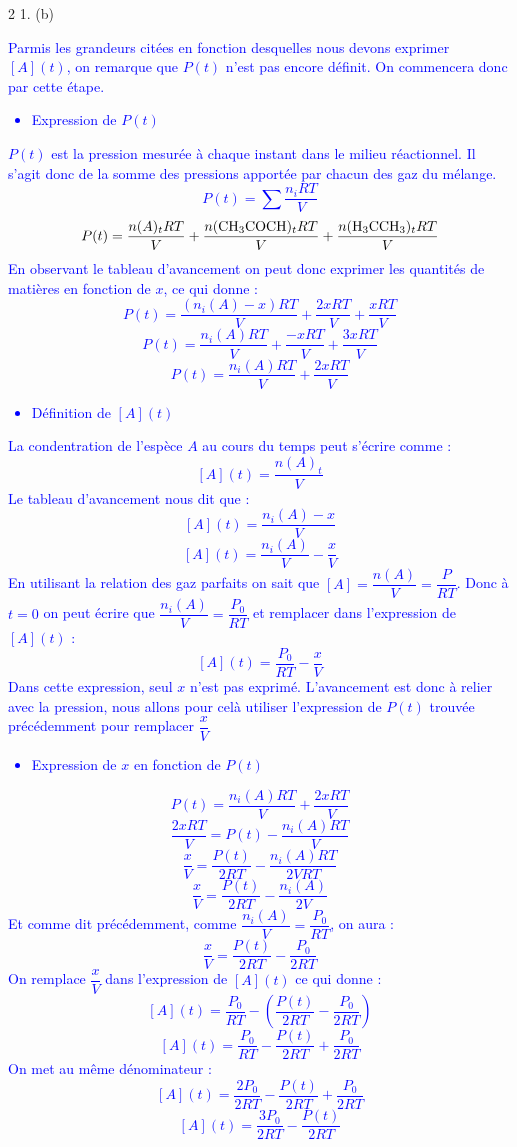 \documentclass[a4paper,11pt,fleqn]{article}%
\begin{document}
\begin{multicols}{2}
1. (b) \textcolor{blue}{Parmis les grandeurs citées en fonction desquelles nous devons exprimer $[A](t)$, on remarque que $P(t)$ n'est pas encore définit. On commencera donc par cette étape. \begin{itemize}
    \item Expression de $P(t)$
\end{itemize}
$P(t)$ est la pression mesurée à chaque instant dans le milieu réactionnel. Il s'agit donc de la somme des pressions apportée par chacun des gaz du mélange. $$P(t) = \sum{\dfrac{n_i R T}{V}}$$
$$P(t) = \dfrac{n(A)_t R T}{V} + \dfrac{n(\ce{CH3COCH})_t R T}{V} + \dfrac{n(\ce{H3CCH3})_t R T}{V}$$
En observant le tableau d'avancement on peut donc exprimer les quantités de matières en fonction de $x$, ce qui donne :
$$P(t) = \dfrac{(n_i(A)-x) R T}{V} + \dfrac{2x R T}{V} + \dfrac{x R T}{V}$$
$$P(t) = \dfrac{n_i(A) R T}{V} + \dfrac{-x R T}{V} + \dfrac{3x R T}{V}$$
$$P(t) = \dfrac{n_i(A) R T}{V}+ \dfrac{2x R T}{V}$$
\begin{itemize}
    \item Définition de $[A](t)$
\end{itemize}
La condentration de l'espèce $A$ au cours du temps peut s'écrire comme :
$$ [A](t) = \dfrac{n(A)_t}{V}$$
Le tableau d'avancement nous dit que :
$$ [A](t) = \dfrac{n_i(A)-x}{V}$$
$$ [A](t) = \dfrac{n_i(A)}{V} - \dfrac{x}{V}$$
En utilisant la relation des gaz parfaits on sait que $[A] = \dfrac{n(A)}{V} = \dfrac{P}{RT}$. Donc à $t=0$ on peut écrire que $\dfrac{n_i(A)}{V} = \dfrac{P_0}{RT}$ et remplacer dans l'expression de $ [A](t)$ :
$$ [A](t) = \dfrac{P_0}{RT} - \dfrac{x}{V}$$
Dans cette expression, seul $x$ n'est pas exprimé. L'avancement est donc à relier avec la pression, nous allons pour celà utiliser l'expression de $P(t)$ trouvée précédemment pour remplacer $\dfrac{x}{V}$
\begin{itemize}
    \item Expression de $x$ en fonction de $P(t)$
\end{itemize}
$$P(t) = \dfrac{n_i(A) R T}{V}+ \dfrac{2x R T}{V}$$
$$\dfrac{2x R T}{V} = P(t) - \dfrac{n_i(A) R T}{V}$$
$$\dfrac{x}{V} = \dfrac{P(t)}{2RT} - \dfrac{n_i(A) R T}{2VRT}$$
$$\dfrac{x}{V} =\dfrac{P(t)}{2RT} - \dfrac{n_i(A)}{2V}$$
Et comme dit précédemment, comme $\dfrac{n_i(A)}{V} = \dfrac{P_0}{RT}$, on aura :
$$\dfrac{x}{V} =\dfrac{P(t)}{2RT} - \dfrac{P_0}{2RT}$$
On remplace $\dfrac{x}{V}$ dans l'expression de $[A](t)$ ce qui donne :
$$ [A](t) = \dfrac{P_0}{RT} - \left(\dfrac{P(t)}{2RT} - \dfrac{P_0}{2RT}\right)$$
$$ [A](t) = \dfrac{P_0}{RT} - \dfrac{P(t)}{2RT} + \dfrac{P_0}{2RT}$$
On met au même dénominateur :
$$ [A](t) = \dfrac{2P_0}{2RT} - \dfrac{P(t)}{2RT} + \dfrac{P_0}{2RT}$$
$$ [A](t) = \dfrac{3P_0}{2RT} - \dfrac{P(t)}{2RT}$$
\begin{center}
\end{center}
}


\end{multicols}
\end{document}
